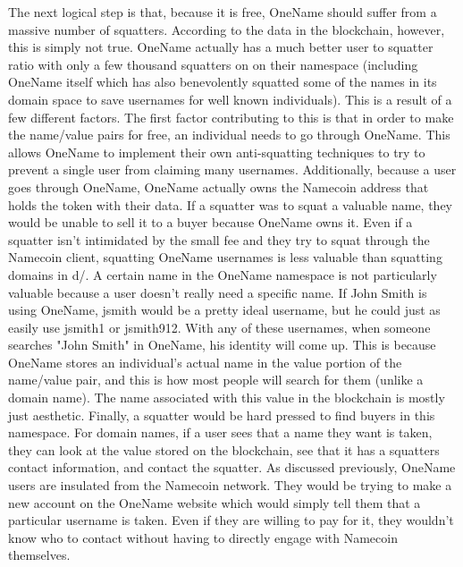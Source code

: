 The next logical step is that, because it is free, OneName should suffer from a massive number of squatters. According to the data in the blockchain, however, this is simply not true. OneName actually has a much better user to squatter ratio with only a few thousand squatters on on their namespace (including OneName itself which has also benevolently squatted some of the names in its domain space to save usernames for well known individuals). This is a result of a few different factors. The first factor contributing to this is that in order to make the name/value pairs for free, an individual needs to go through OneName. This allows OneName to implement their own anti-squatting techniques to try to prevent a single user from claiming many usernames. Additionally, because a user goes through OneName, OneName actually owns the Namecoin address that holds the token with their data. If a squatter was to squat a valuable name, they would be unable to sell it to a buyer because OneName owns it. Even if a squatter isn't intimidated by the small fee and they try to squat through the Namecoin client, squatting OneName usernames is less valuable than squatting domains in d/. A certain name in the OneName namespace is not particularly valuable because a user doesn't really need a specific name. If John Smith is using OneName, jsmith would be a pretty ideal username, but he could just as easily use jsmith1 or jsmith912. With any of these usernames, when someone searches "John Smith" in OneName, his identity will come up. This is because OneName stores an individual's actual name in the value portion of the name/value pair, and this is how most people will search for them (unlike a domain name). The name associated with this value in the blockchain is mostly just aesthetic. Finally, a squatter would be hard pressed to find buyers in this namespace. For domain names, if a user sees that a name they want is taken, they can look at the value stored on the blockchain, see that it has a squatters contact information, and contact the squatter. As discussed previously, OneName users are insulated from the Namecoin network. They would be trying to make a new account on the OneName website which would simply tell them that a particular username is taken. Even if they are willing to pay for it, they wouldn't know who to contact without having to directly engage with Namecoin themselves. 

